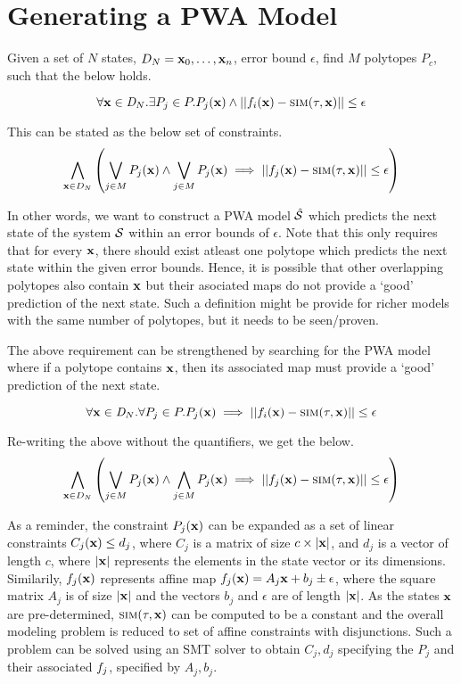 \section{Generating a PWA Model}

Given a set of $N$ states, $D_N = {\mathbf{x}_0,\dots,\mathbf{x}_n}$, error bound
$\epsilon$, find $M$ polytopes $P_{c}$, such that the below holds.

\[\forall\mathbf{x}\in\mathit{D}_N.\exists P_j \in P.P_j(\mathbf{x})\land||f_{i}(\mathbf{x}) - \mbox{\sc sim}(\tau,\mathbf{x})||\le\epsilon\]

This can be stated as the below set of constraints.
\[\displaystyle\bigwedge_{\mathbf{x}\in D_N} \left(
        \displaystyle\bigvee_{j\in M} P_j(\mathbf{x})
        \land
        \displaystyle\bigvee_{j\in M} P_j(\mathbf{x})
\implies ||f_{j}(\mathbf{x}) - \mbox{\sc sim}(\tau,\mathbf{x})||\le\epsilon\right)\]

In other words, we want to construct a PWA model $\hat{\mathcal{S}}$ which
predicts the next state of the system $\mathcal{S}$ within an error bounds
of $\epsilon$. Note that this only requires that for every $\mathbf{x}$, there
should exist atleast one polytope which predicts the next state within
the given error bounds. Hence, it is possible that other overlapping
polytopes also contain $\mathbf{x}$ but their asociated maps do not provide a
`good' prediction of the next state.
Such a definition might be provide for richer models with the same
number of polytopes, but it needs to be seen/proven.

The above requirement can be strengthened by searching for the PWA
model where if a polytope contains $\mathbf{x}$, then its associated map must
provide a `good' prediction of the next state.

\[\forall\mathbf{x}\in\mathit{D}_N.\forall P_j \in P.P_j(\mathbf{x}) \implies ||f_{i}(\mathbf{x}) - \mbox{\sc sim}(\tau,\mathbf{x})||\le\epsilon\]

Re-writing the above without the quantifiers, we get the below.
\[\displaystyle\bigwedge_{\mathbf{x}\in D_N} \left(
        \displaystyle\bigvee_{j\in M} P_j(\mathbf{x})
        \land
        \displaystyle\bigwedge_{j\in M} P_j(\mathbf{x})
\implies ||f_{j}(\mathbf{x}) - \mbox{\sc sim}(\tau,\mathbf{x})||\le\epsilon\right)\]

As a reminder, the constraint $P_j(\mathbf{x})$ can be expanded as a set of
linear constraints $C_j(\mathbf{x}) \le d_j$, where $C_j$ is a matrix of size
$c\times|\mathbf{x}|$, and $d_j$ is a vector of length $c$, where $|\mathbf{x}|$
represents the elements in the state vector or its dimensions.
Similarily, $f_{j}(\mathbf{x})$ represents affine map $f_{j}(\mathbf{x}) =
A_j \mathbf{x} + b_j \pm \epsilon$, where the square matrix $A_j$ is of size
$|\mathbf{x}|$ and the vectors $b_j$ and $\epsilon$ are of length $|\mathbf{x}|$. As
the states $\mathbf{x}$ are pre-determined, $\mbox{\sc sim}(\tau,\mathbf{x})$ can be
computed to be a constant and the overall modeling problem is
reduced to set of affine constraints with disjunctions. Such a problem
can be solved using an SMT solver to obtain $C_j, d_j$ specifying the
$P_j$ and their associated $f_{j}$, specified by $A_j, b_j$.

